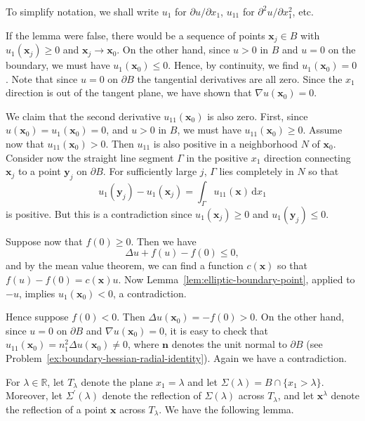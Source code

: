 \begin{Proof}
To simplify notation, we shall write $u_1$ for $\partial u/\partial x_1$, $u_{11}$ for $\partial^2u/\partial x_1^2$, etc.

If the lemma were false, there would be a sequence of points $\bm{x}_j\in B$ with $u_1(\bm{x}_j)\geq0$ and $\bm{x}_j\to\bm{x}_0$. On the other hand, since $u>0$ in $B$ and $u=0$ on the boundary, we must have $u_1(\bm{x}_0)\leq0$. Hence, by continuity, we find $u_1(\bm{x}_0)=0$. Note that since $u=0$ on $\partial B$ the tangential derivatives are all zero. Since the $x_1$ direction is out of the tangent plane, we have shown that $\nabla u(\bm{x}_0)=0$.

We claim that the second derivative $u_{11}(\bm{x}_0)$ is also zero. First, since $u(\bm{x}_0)=u_1(\bm{x}_0)=0$, and $u>0$ in $B$, we must have $u_{11}(\bm{x}_0)\geq0$. Assume now that $u_{11}(\bm{x}_0)>0$. Then $u_{11}$ is also positive in a neighborhood $N$ of $\bm{x}_0$. Consider now the straight line segment $\Gamma$ in the positive $x_1$ direction connecting $\bm{x}_j$ to a point $\bm{y}_j$ on $\partial B$. For sufficiently large $j$, $\Gamma$ lies completely in $N$ so that
\begin{equation}\label{eq:radial-boundary-second-derivative-segment}
u_1(\bm{y}_j)-u_1(\bm{x}_j)=\int_\Gamma u_{11}(\bm{x})\,\mathrm{d}x_1
\end{equation}
is positive. But this is a contradiction since $u_1(\bm{x}_j)\geq0$ and $u_1(\bm{y}_j)\leq0$.

Suppose now that $f(0)\geq0$. Then we have
\begin{equation}\label{eq:radial-nonlinearity-zero-value-shift}
\Delta u+f(u)-f(0)\leq0,
\end{equation}
and by the mean value theorem, we can find a function $c(\bm{x})$ so that $f(u)-f(0)=c(\bm{x})u$. Now Lemma~\ref{lem:elliptic-boundary-point}, applied to $-u$, implies $u_1(\bm{x}_0)<0$, a contradiction.

Hence suppose $f(0)<0$. Then $\Delta u(\bm{x}_0)=-f(0)>0$. On the other hand, since $u=0$ on $\partial B$ and $\nabla u(\bm{x}_0)=0$, it is easy to check that $u_{11}(\bm{x}_0)=n_1^2\Delta u(\bm{x}_0)\ne0$, where $\bm{n}$ denotes the unit normal to $\partial B$ (see Problem~\ref{ex:boundary-hessian-radial-identity}). Again we have a contradiction.
\end{Proof}

For $\lambda\in\mathbb{R}$, let $T_\lambda$ denote the plane $x_1=\lambda$ and let $\Sigma(\lambda)=B\cap\{x_1>\lambda\}$. Moreover, let $\Sigma^{\prime}(\lambda)$ denote the reflection of $\Sigma(\lambda)$ across $T_\lambda$, and let $\bm{x}^\lambda$ denote the reflection of a point $\bm{x}$ across $T_\lambda$. We have the following lemma.

